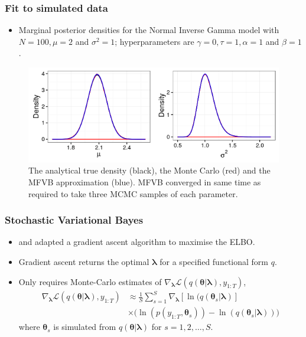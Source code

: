 \documentclass{beamer}\usepackage[]{graphicx}\usepackage[]{color}
\begin{document}
\begin{frame}
\frametitle{Fit to simulated data}
\begin{itemize}
\item Marginal posterior densities for the Normal Inverse Gamma model with $N = 100, \mu = 2$ and $\sigma^2 = 1$; hyperparameters are $\gamma = 0, \tau = 1, \alpha = 1$ and $\beta = 1$. 
\end{itemize}
\begin{figure}[h]
\centering
\includegraphics[width=0.7\linewidth,height=\textheight,keepaspectratio]{norminvg}
\caption{The analytical true density (black), the Monte Carlo (red) and the MFVB approximation (blue). MFVB converged in same time as required to take three MCMC samples of each parameter.}
\label{fig:norminvg}
\end{figure}
\end{frame}


\begin{frame}
\frametitle{Stochastic Variational Bayes}
\begin{itemize}
\item \citet{Paisley2012} and \citet{Ranganath2014} adapted a gradient ascent algorithm to maximise the ELBO.
\item Gradient ascent returns the optimal $\boldsymbol{\lambda}$ for a specified functional form $q$.
\item Only requires Monte-Carlo estimates of $\nabla_{\boldsymbol{\lambda}}\mathcal{L}(q(\boldsymbol{\theta} | \boldsymbol{\lambda}), y_{1:T})$,
\begin{align}
\label{SVB}
\nabla_{\boldsymbol{\lambda}}\mathcal{L}(q(\boldsymbol{\theta} | \boldsymbol{\lambda}), y_{1:T}) &\approx \frac{1}{S}\sum_{s=1}^{S} \nabla_{\boldsymbol{\lambda}} [\ln(q(\boldsymbol{\theta}_s | \boldsymbol{\lambda})] \nonumber \\
&\times \big(\ln (p(y_{1:T}, \boldsymbol{\theta}_s)) - \ln(q(\boldsymbol{\theta}_s | \boldsymbol{\lambda}))\big) 
\end{align}
where $\boldsymbol{\theta}_s$ is simulated from $q(\boldsymbol{\theta} | \boldsymbol{\lambda})$ for $s = 1, 2, \dots, S$. 
\end{itemize}
\end{frame}
\end{document}
